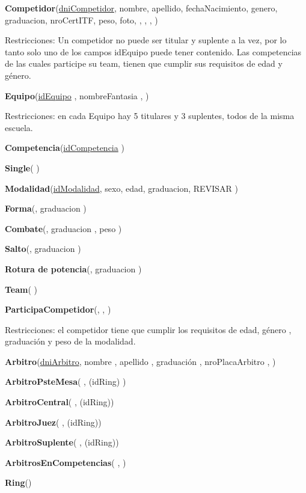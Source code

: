\textbf{Competidor}(\uline{dniCompetidor}, nombre, apellido, fechaNacimiento, genero, graduacion, nroCertITF, peso, foto,  ,  ,  ,  )

Restricciones: Un competidor no puede ser titular y suplente a la vez, por lo tanto solo uno de los campos idEquipo puede tener contenido. Las competencias de las cuales participe su team, tienen que cumplir sus requisitos de edad y género.

\textbf{Equipo}(\uline{idEquipo} , nombreFantasia ,  )

Restricciones: en cada Equipo hay 5 titulares y 3 suplentes, todos de la misma escuela.

\textbf{Competencia}(\uline{idCompetencia} )

\textbf{Single}(  )

\textbf{Modalidad}(\uline{idModalidad}, sexo, edad, graduacion, REVISAR )

\textbf{Forma}(, graduacion )

\textbf{Combate}(, graduacion , peso )

\textbf{Salto}(, graduacion )

\textbf{Rotura de potencia}(, graduacion )

\textbf{Team}( )

\textbf{ParticipaCompetidor}(, , )

Restricciones: el competidor tiene que cumplir los requisitos de edad, género , graduación y peso de la modalidad.

\textbf{Arbitro}(\uline{dniArbitro}, nombre , apellido , graduación , nroPlacaArbitro ,  )

\textbf{ArbitroPsteMesa}( , \dashuline(idRing) )

\textbf{ArbitroCentral}( , \dashuline(idRing))

\textbf{ArbitroJuez}( , \dashuline(idRing))

\textbf{ArbitroSuplente}( , \dashuline(idRing))

\textbf{ArbitrosEnCompetencias}( ,  )

\textbf{Ring}()

